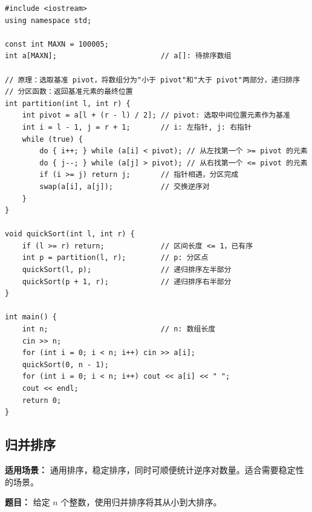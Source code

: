 \documentclass[12pt,a4paper]{ctexart}
\begin{document}
\begin{lstlisting}[caption={快速排序——分治 + 分区}]
#include <iostream>
using namespace std;

const int MAXN = 100005;
int a[MAXN];                        // a[]: 待排序数组

// 原理：选取基准 pivot，将数组分为"小于 pivot"和"大于 pivot"两部分，递归排序
// 分区函数：返回基准元素的最终位置
int partition(int l, int r) {
    int pivot = a[l + (r - l) / 2]; // pivot: 选取中间位置元素作为基准
    int i = l - 1, j = r + 1;       // i: 左指针, j: 右指针
    while (true) {
        do { i++; } while (a[i] < pivot); // 从左找第一个 >= pivot 的元素
        do { j--; } while (a[j] > pivot); // 从右找第一个 <= pivot 的元素
        if (i >= j) return j;       // 指针相遇，分区完成
        swap(a[i], a[j]);           // 交换逆序对
    }
}

void quickSort(int l, int r) {
    if (l >= r) return;             // 区间长度 <= 1，已有序
    int p = partition(l, r);        // p: 分区点
    quickSort(l, p);                // 递归排序左半部分
    quickSort(p + 1, r);            // 递归排序右半部分
}

int main() {
    int n;                          // n: 数组长度
    cin >> n;
    for (int i = 0; i < n; i++) cin >> a[i];
    quickSort(0, n - 1);
    for (int i = 0; i < n; i++) cout << a[i] << " ";
    cout << endl;
    return 0;
}
\end{lstlisting}

\subsection{归并排序}
\textbf{适用场景：} 通用排序，稳定排序，同时可顺便统计逆序对数量。适合需要稳定性的场景。

\textbf{题目：} 给定 $n$ 个整数，使用归并排序将其从小到大排序。
\end{document}
